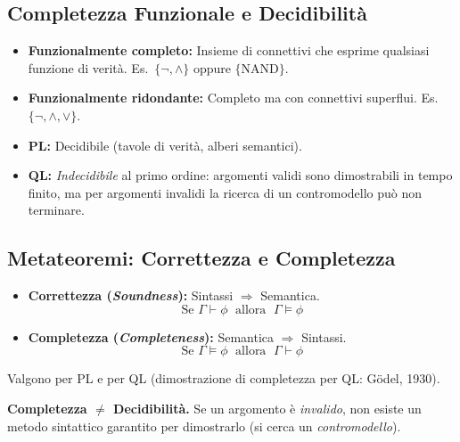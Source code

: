 \documentclass[10pt,a4paper]{article}
\newcommand{\entails}{\vDash}
\newcommand{\proves}{\vdash}
\begin{document}
\subsection{Completezza Funzionale e Decidibilità}

\begin{itemize}[leftmargin=*, itemsep=1pt, topsep=0pt]
  \item \textbf{Funzionalmente completo:} Insieme di connettivi che
    esprime qualsiasi funzione di verità. Es.\ $\{\lnot, \land\}$
    oppure $\{\text{NAND}\}$.
  \item \textbf{Funzionalmente ridondante:} Completo ma con connettivi
    superflui. Es.\ $\{\lnot, \land, \lor\}$.
  \item \textbf{PL:} Decidibile (tavole di verità, alberi semantici).
  \item \textbf{QL:} \emph{Indecidibile} al primo ordine: argomenti validi
    sono dimostrabili in tempo finito, ma per argomenti invalidi la ricerca
    di un contromodello può non terminare.
\end{itemize}

\subsection{Metateoremi: Correttezza e Completezza}

\begin{definizione}
\begin{itemize}[leftmargin=*, itemsep=2pt, topsep=0pt]
  \item \textbf{Correttezza (\textit{Soundness}):}
    Sintassi $\Rightarrow$ Semantica.
    \[ \text{Se } \Gamma \proves \phi \;\text{ allora }\; \Gamma \entails \phi \]
  \item \textbf{Completezza (\textit{Completeness}):}
    Semantica $\Rightarrow$ Sintassi.
    \[ \text{Se } \Gamma \entails \phi \;\text{ allora }\; \Gamma \proves \phi \]
\end{itemize}
\end{definizione}

Valgono per PL e per QL (dimostrazione di completezza per QL: Gödel, 1930).

\begin{attenzione}
\textbf{Completezza $\neq$ Decidibilità.} Se un argomento è
\emph{invalido}, non esiste un metodo sintattico garantito per
dimostrarlo (si cerca un \emph{contromodello}).
\end{attenzione}

\newpage
\end{document}
